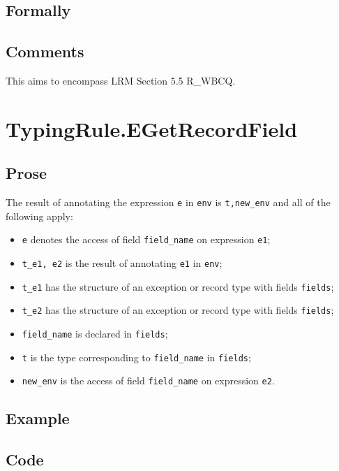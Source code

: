 \documentclass{book}
\begin{document}
\begin{emptyformal}
    \subsection{Formally}
\end{emptyformal}

\subsection{Comments}
  This aims to encompass LRM Section 5.5 R\_WBCQ.

 
\section{TypingRule.EGetRecordField \label{sec:TypingRule.EGetRecordField}}

  \subsection{Prose}
  The result of annotating the expression \texttt{e} in \texttt{env} is
\texttt{t,new\_env} and all of the following apply:
  \begin{itemize}
  \item \texttt{e} denotes the access of field \texttt{field\_name} on expression \texttt{e1};
  \item \texttt{t\_e1, e2} is the result of annotating \texttt{e1} in \texttt{env};
  \item \texttt{t\_e1} has the structure of an exception or record type with fields \texttt{fields};
  \item \texttt{t\_e2} has the structure of an exception or record type with fields \texttt{fields};
  \item \texttt{field\_name} is declared in \texttt{fields};
  \item \texttt{t} is the type corresponding to \texttt{field\_name} in \texttt{fields};
  \item \texttt{new\_env} is the access of field \texttt{field\_name} on expression \texttt{e2}.
  \end{itemize}

  \subsection{Example}

  \subsection{Code}
\end{document}

